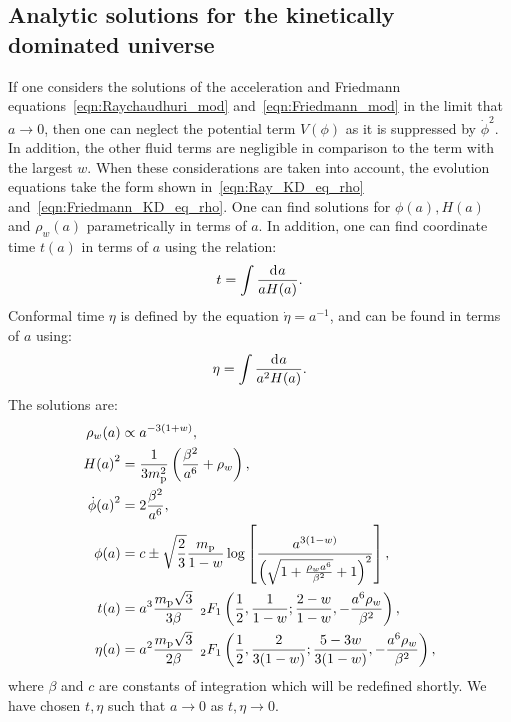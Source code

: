 \subsection{Analytic solutions for the kinetically dominated universe} 
If one considers the solutions of the acceleration and Friedmann equations~\eqref{eqn:Raychaudhuri_mod} and~\eqref{eqn:Friedmann_mod} in the limit that \(a\to0\), then one can neglect the potential term \(V(\phi)\) as it is suppressed by \(\dot{\phi}^2\). In addition, the other fluid terms are negligible in comparison to the term with the largest \(w\).  When these considerations are taken into account, the evolution equations take the form shown in~\eqref{eqn:Ray_KD_eq_rho} and~\eqref{eqn:Friedmann_KD_eq_rho}. One can find solutions for \(\phi(a),H(a)\) and \(\rho_w(a)\) parametrically in terms of \(a\).  In addition, one can find coordinate time \(t(a)\) in terms of \(a\) using the relation:
\begin{equation}
  t = \int \frac{\operatorname{d}^{}\!{a}}{aH(a)}.
\end{equation}
Conformal time \(\eta\) is defined by the equation \(\dot{\eta} =
a^{-1}\), and can be found in terms of \(a\) using:
\begin{equation}
  \eta = \int \frac{\operatorname{d}^{}\!{a}}{a^2H(a)}.
\end{equation}
The solutions are:
\begin{align}
  \rho_w(a) 
  &\propto 
  a^{-3(1+w)} ,
  \\
  H{(a)}^2 
  &= 
  \frac{1}{3m_{\mathrm{p}}^2}\left(\frac{\beta^2}{a^6} + \rho_w\right)  ,
  \label{eqn:H_of_a}
  \\
  \dot{\phi}{(a)}^2
  &=
  2\frac{\beta^2}{a^6} ,
  \label{eqn:dotphi_of_a}
  \\
  \phi(a)
  &=
  c  \pm
  \sqrt{\frac{2}{3}}\frac{m_{\mathrm{p}}}{1-w} \log \left[ 
  \frac 
  {{a}^{3(1-w)}}
  {{\left(\sqrt{1+\frac{\rho_w{a}^{6}}{\beta^2}}+1\right)}^2} 
  \right]  ,
  \label{eqn:phi_of_a}
  \\
  t(a)
  &=
  a^3 \frac{m_{\mathrm{p}}\sqrt{3}}{3\beta} 
  \:\: 
  {_2F_1}\left(
  \frac{1}{2},
  \frac{1}{1-w};
  \frac{2-w}{1-w},
  -\frac{a^6\rho_w}{\beta^2}
  \right) ,
  \label{eqn:t_of_a}
  \\
  \eta(a) 
  &= 
  a^2 \frac{m_{\mathrm{p}}\sqrt{3}}{2\beta}
  \:\: 
  {_2F_1}\left(
  \frac{1}{2},
  \frac{2}{3(1-w)};
  \frac{5-3w}{3(1-w)},
  -\frac{a^6\rho_w}{\beta^2}
  \right),
  \label{eqn:eta_of_a}
\end{align}
where \(\beta\) and \(c\) are constants of integration which will be redefined shortly. We have chosen \(t,\eta\) such that \(a\to0\) as \(t,\eta \to 0\).


